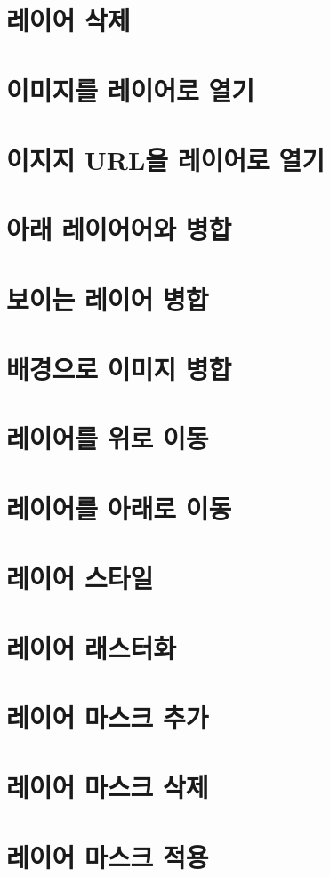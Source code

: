 \documentclass[12pt, a4paper, oneside]{book}
\let\stdsection\section
\renewcommand\section{\newpage\stdsection}
\begin{document}
\section{	레이어 삭제				}							
\section{	이미지를 레이어로 열기				}							
\section{	이지지 URL을 레이어로 열기				}							
\section{	아래 레이어어와 병합				}							
\section{	보이는 레이어 병합				}							
\section{	배경으로 이미지 병합				}							
\section{	레이어를 위로 이동				}							
\section{	레이어를 아래로 이동				}							
\section{	레이어 스타일				}							
\section{	레이어 래스터화				}							
\section{	레이어 마스크 추가				}							
\section{	레이어 마스크 삭제				}							
\section{	레이어 마스크 적용				}							
\end{document}
